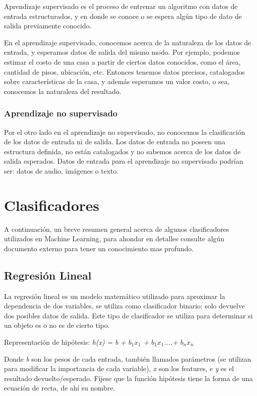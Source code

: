 \documentclass[a4paper,12pt,oneside,spanish]{book}
\begin{document}
Aprendizaje supervisado es el proceso de entrenar un algoritmo con datos de entrada estructurados, y en donde se conoce o se espera algún tipo de dato de salida previamente conocido. \par

En el aprendizaje supervisado, conocemos acerca de la naturaleza de los datos de entrada, y esperamos datos de salida del mismo modo. Por ejemplo, podemos estimar el costo de una casa a partir de ciertos datos conocidos, como el área, cantidad de pisos, ubicación, etc. Entonces tenemos datos precisos, catalogados sobre características de la casa, y además esperamos un valor costo, o sea, conocemos la naturaleza del resultado.\par

\subsubsection{Aprendizaje no supervisado}

Por el otro lado en el aprendizaje no supervisado, no conocemos la clasificación de los datos de entrada ni de salida. Los datos de entrada no poseen una estructura definida, no están catalogados y no sabemos acerca de los datos de salida esperados. Datos de entrada para el aprendizaje no supervisado podrían ser: datos de audio, imágenes o texto. \par

\section{Clasificadores}
A continuación, un breve resumen general acerca de algunos clasificadores utilizados en Machine Learning, para ahondar en detalles consulte algún documento externo para tener un conocimiento mas profundo.\par
\subsection{Regresión Lineal}

La regresión lineal es un modelo matemático utilizado para aproximar la dependencia de dos variables, se utiliza como clasificador binario: solo devuelve dos posibles datos de salida. Este tipo de clasificador se utiliza para determinar si un objeto es o no es de cierto tipo. \par
Representación de hipótesis: \textit{h(x) = b + $b_1$$x_1$ + $b_1$$x_1$....+ $b_n$$x_n$}
	
Donde \textit{b} son los pesos de cada entrada, también llamados parámetros (se utilizan para modificar la importancia de cada variable), \textit{x} son los features, e \textit{y} es el resultado devuelto/esperado. Fíjese que la función hipótesis tiene la forma de una ecuación de recta, de ahí su nombre. \par
\end{document}
